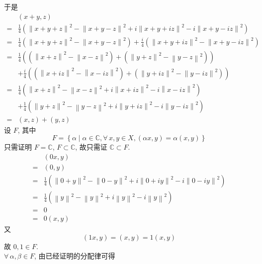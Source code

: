 \documentclass[\ROOT/main.tex]{subfiles}
\begin{document}
于是
\begin{align*}
    & \left( x + y, z \right) \\
    =& \frac{1}{4} \left( \left\| x + y + z \right\|^2 - \left\| x + y - z \right\|^2 + i \left\| x + y + i z \right\|^2 - i \left\| x + y - i z \right\|^2 \right) \\
    =& \frac{1}{4} \left( \left\| x + y + z \right\|^2 - \left\| x + y - z \right\|^2 \right) + \frac{i}{4} \left( \left\| x + y + i z \right\|^2 - \left\| x + y - i z \right\|^2 \right) \\
    =& \frac{1}{4} \left( \left( \left\| x + z \right\|^2 - \left\| x - z \right\|^2 \right) + \left( \left\| y + z \right\|^2 - \left\| y - z \right\|^2 \right) \right) \\
    & + \frac{i}{4} \left( \left( \left\| x + i z \right\|^2 - \left\| x - i z \right\|^2 \right) + \left( \left\| y + i z \right\|^2 - \left\| y - i z \right\|^2 \right) \right) \\
    =& \frac{1}{4} \left( \left\| x + z \right\|^2 - \left\| x - z \right\|^2 + i \left\| x + i z \right\|^2 - i \left\| x - i z \right\|^2 \right) \\
    & + \frac{1}{4} \left( \left\| y + z \right\|^2 - \left\| y - z \right\|^2 + i \left\| y + i z \right\|^2 - i \left\| y - i z \right\|^2 \right) \\
    =& \left( x, z \right) + \left( y, z \right)
\end{align*}
设 $F$, 其中
\[
    F = \left\{ \alpha \mid \alpha \in \mathbb{C}, \forall \, x, y \in X, \left( \alpha x, y \right) = \alpha \left( x, y \right) \right\}
\]
只需证明 $F = \mathbb{C}$, $F \subset \mathbb{C}$, 故只需证 $\mathbb{C} \subset F$.
\begin{align*}
     & \left( 0 x, y \right) \\
    =& \left( 0, y \right) \\
    =& \frac{1}{4} \left( \left\| 0 + y \right\|^2 - \left\| 0 - y \right\|^2 + i \left\| 0 + i y \right\|^2 - i \left\| 0 - i y \right\|^2 \right) \\
    =& \frac{1}{4} \left( \left\| y \right\|^2 - \left\| y \right\|^2 + i \left\| y \right\|^2 - i \left\| y \right\|^2 \right) \\
    =& 0 \\
    =& 0 \left( x, y \right)
\end{align*}
又
\[
    \left( 1 x, y \right)
    = \left( x , y \right)
    = 1 \left( x, y \right)
\]
故 $0, 1 \in F$. \\
$\forall \, \alpha, \beta \in F$, 由已经证明的分配律可得
\end{document}
